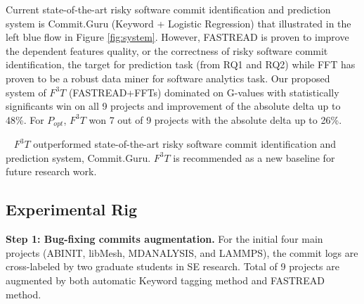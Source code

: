 \documentclass[10pt,conference]{IEEEtran}
\newenvironment{RQ}[1]%
{\noindent\begin{minipage}[c]{\linewidth}%
\begin{bclogo}[couleur=gray!25,%
                arrondi=0.1,%
                logo=\bctrombone,%
                ombre=true]{~#1}}%
{\end{bclogo}\end{minipage}\vspace{2mm}}
\begin{document}
Current state-of-the-art risky software commit identification and prediction system is Commit.Guru (Keyword + Logistic Regression) that illustrated in the left blue flow in Figure \ref{fig:system}. However, FASTREAD is proven to improve the dependent features quality, or the correctness of risky software commit identification, the target for prediction task (from RQ1 and RQ2) while FFT has proven to be a robust data miner for software analytics task. Our proposed system of $F^3T$ (FASTREAD+FFTs) dominated on G-values with statistically significants win on all 9 projects and improvement  of the absolute delta up to 48\%. For $P_{opt}$,  $F^3T$ won 7 out of 9 projects with the absolute delta up to 26\%. 

  
\begin{RQ}{}
\vspace{-10pt}
$F^3T$ outperformed state-of-the-art risky software commit identification and prediction system, Commit.Guru. $F^3T$ is recommended as a new baseline for future research work.
\end{RQ}

 

 


\subsection{Experimental Rig}

\noindent \textbf{Step 1: Bug-fixing commits augmentation.} For the initial four main projects (ABINIT, libMesh, MDANALYSIS, and LAMMPS), the commit logs are cross-labeled by two graduate students in SE research. Total of 9 projects are augmented by both automatic Keyword tagging method and FASTREAD method. 
\end{document}
